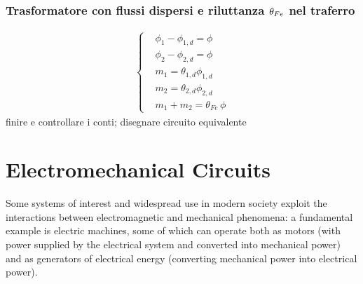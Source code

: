 \documentclass[letterpaper,10pt,english]{jupyterBook}
\begin{document}
\subsubsection{Trasformatore con flussi dispersi e riluttanza \protect\(\theta_{Fe}\protect\) nel traferro}
\label{\detokenize{ch/circuits-electromagnetic-transformer:trasformatore-con-flussi-dispersi-e-riluttanza-theta-fe-nel-traferro}}\begin{equation*}
\begin{split}\begin{cases}
 & \phi_{1} - \phi_{1,d} = \phi \\
 & \phi_{2} - \phi_{2,d} = \phi \\
 & m_{1} = \theta_{1,d} \phi_{1,d} \\
 & m_{2} = \theta_{2,d} \phi_{2,d} \\
 & m_1   + m_{2} = \theta_{Fe} \, \phi
\end{cases}\end{split}
\end{equation*}
\sphinxAtStartPar
{} finire e controllare i conti; disegnare circuito equivalente



\sphinxstepscope




\section{Electromechanical Circuits}
\label{\detokenize{ch/circuits-electromechanic:electromechanical-circuits}}\label{\detokenize{ch/circuits-electromechanic:classical-electromagnetism-circuits-electromechanic}}\label{\detokenize{ch/circuits-electromechanic::doc}}
\sphinxAtStartPar
Some systems of interest and widespread use in modern society exploit the interactions between electromagnetic and mechanical phenomena: a fundamental example is electric machines, some of which can operate both as motors (with power supplied by the electrical system and converted into mechanical power) and as generators of electrical energy (converting mechanical power into electrical power).
\end{document}

